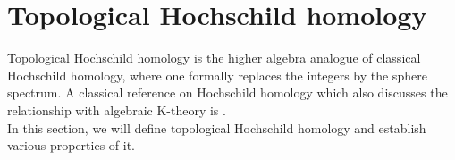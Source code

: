 





\section{Topological Hochschild homology}\label{THH}
Topological Hochschild homology is the higher algebra analogue of classical Hochschild homology, where one formally replaces the integers by the sphere spectrum. A classical reference on Hochschild homology which also discusses the relationship with algebraic K-theory is \cite{loday2013cyclic}.\\
In this section, we will define topological Hochschild homology and establish various properties of it.

